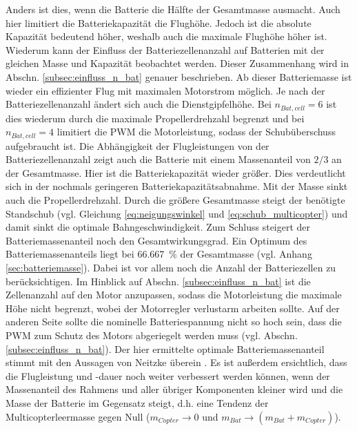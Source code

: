 Anders ist dies, wenn die Batterie die Hälfte der Gesamtmasse ausmacht. Auch hier limitiert die Batteriekapazität die Flughöhe. Jedoch ist die absolute Kapazität bedeutend höher, weshalb auch die maximale Flughöhe höher ist. Wiederum kann der Einfluss der Batteriezellenanzahl auf Batterien mit der gleichen Masse und Kapazität beobachtet werden. Dieser Zusammenhang wird in Abschn. \ref{subsec:einfluss_n_bat} genauer beschrieben. Ab dieser Batteriemasse ist wieder ein effizienter Flug mit maximalen Motorstrom möglich. Je nach der Batteriezellenanzahl ändert sich auch die Dienstgipfelhöhe. Bei \ensuremath{n_{Bat,cell} = 6} ist dies wiederum durch die maximale Propellerdrehzahl begrenzt und bei \ensuremath{n_{Bat,cell} = 4} limitiert die PWM die Motorleistung, sodass der Schubüberschuss aufgebraucht ist. Die Abhängigkeit der Flugleistungen von der Batteriezellenanzahl zeigt auch die Batterie mit einem Massenanteil von \ensuremath{2/3} an der Gesamtmasse. Hier ist die Batteriekapazität wieder größer. Dies verdeutlicht sich in der nochmals geringeren Batteriekapazitätsabnahme. Mit der Masse sinkt auch die Propellerdrehzahl. Durch die größere Gesamtmasse steigt der benötigte Standschub (vgl. Gleichung \eqref{eq:neigungswinkel} und \eqref{eq:schub_multicopter}) und damit sinkt die optimale Bahngeschwindigkeit.
Zum Schluss steigert der Batteriemassenanteil noch den Gesamtwirkungsgrad. 
Ein Optimum des Batteriemassenanteils liegt bei \SI{66,667}{\%} der Gesamtmasse (vgl. Anhang \ref{sec:batteriemasse}). Dabei ist vor allem noch die Anzahl der Batteriezellen zu berücksichtigen. Im Hinblick auf Abschn. \ref{subsec:einfluss_n_bat} ist die Zellenanzahl auf den Motor anzupassen, sodass die Motorleistung die maximale Höhe nicht begrenzt, wobei der Motorregler verlustarm arbeiten sollte. Auf der anderen Seite sollte die nominelle Batteriespannung nicht so hoch sein, dass die PWM zum Schutz des Motors abgeriegelt werden muss (vgl. Abschn. \ref{subsec:einfluss_n_bat}). 
Der hier ermittelte optimale Batteriemassenanteil stimmt mit den Aussagen von Neitzke überein \cite{Neitzke.2013}.
Es ist außerdem ersichtlich, dass die Flugleistung und -dauer noch weiter verbessert werden können, wenn der Massenanteil des Rahmens und aller übriger Komponenten kleiner wird und die Masse der Batterie im Gegensatz steigt, d.h. eine Tendenz der Multicopterleermasse gegen Null (\ensuremath{m_{Copter}\rightarrow 0} und \ensuremath{m_{Bat}\rightarrow (m_{Bat}+m_{Copter})}).


